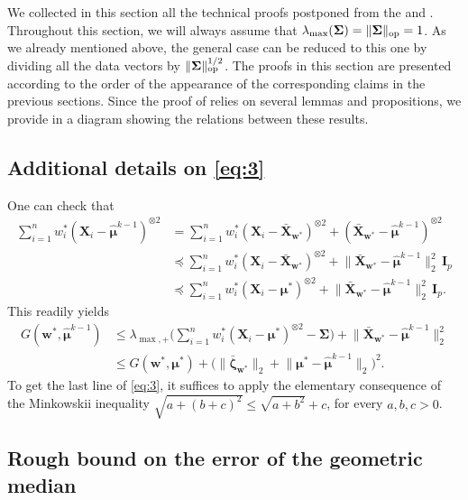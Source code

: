 \documentclass[aos,preprint,reqno]{imsart}
\newcommand\bs{\boldsymbol}
\newcommand\bmu{\boldsymbol\mu}
\newcommand\bzeta{\boldsymbol\zeta}
\newcommand\bSigma{\boldsymbol\Sigma}
\newcommand\bw{\boldsymbol w}
\newcommand\bfI{\mathbf I}
\def\hat{\widehat}
\theoremstyle{plain}
\theoremstyle{remark}
\begin{document}
	We collected in this section all the technical proofs postponed from 
	the  and . Throughout this section, we will always assume
	that $\lambda_{\max}(\bSigma) = \|\bSigma\|_{\textup{op}} = 1$. As we
	already mentioned above, the general case can be reduced to this one
	by dividing all the data vectors by $\|\bSigma\|_{\textup{op}}^{1/2}$. 
	The proofs in this section are presented according to the order of the 
	appearance of the corresponding claims in the previous sections. 
	Since the proof of  relies on several lemmas and
	propositions, we provide in  a diagram
	showing the relations between these results. 
	
	\subsection{Additional details on \eqref{eq:3}}\label{ssec:6.1}
    
	One can check that
	\begin{align}
		\sum_{i=1}^n  w_i^* (\bs X_i-\hat{\bmu}^{k-1})^{\otimes 2} &= 
		\sum_{i=1}^n w_i^*(\bs X_i-\bar{\bs X}_{\bw^*})^{\otimes 2} 
		+ (\bar{\bs X}_{\bw^*}-\hat{\bmu}^{k-1})^{\otimes 2}\\
		&\preceq \sum_{i=1}^n w_i^*(\bs X_i-\bar{\bs X}_{\bw^*})^{\otimes 2}
		+ \big\|\bar{\bs X}_{\bw^*}-\hat{\bmu}^{k-1}\big\|_2^2\,\bfI_p\\
		&\preceq \sum_{i=1}^n w_i^*(\bs X_i-\bmu^*)^{\otimes 2}
		 + \big\|\bar{\bs X}_{\bw^*}-\hat{\bmu}^{k-1}\big\|_2^2\,\bfI_p.
	\end{align}	
	This readily yields
	\begin{align}
			G(\bw^*,\hat{\bmu}^{k-1}) &\le \lambda_{\max,+}\bigg(\sum_{i=1}^n 
			w_i^*(\bs X_i-\bmu^*)^{\otimes 2} - \bSigma\bigg) + 
			\big\|\bar{\bs X}_{\bw^*}-\hat{\bmu}^{k-1}\big\|_2^2\\
			&\le G(\bw^*, \bmu^*)  + 
			\big(\big\|\bar{\bzeta}_{\bw^*}\big\|_2 + 
			\big\|\bmu^*-\hat{\bmu}^{k-1}\big\|_2\big)^2.
	\end{align}
	To get the last line of \eqref{eq:3}, it suffices to apply the
	elementary consequence of the Minkowskii inequality $\sqrt{a+ (b+c)^2}
	\le \sqrt{a+b^2} + c$, for every $a,b,c>0$. 



	\subsection{Rough bound on the error of the geometric median}
\end{document}
